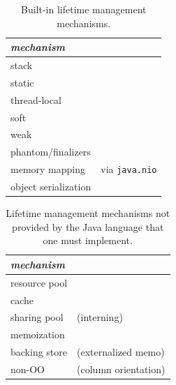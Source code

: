 \begin{table}
\centering
\begin{tabular}{|l|l|} \hline
\em mechanism & \\ \hline \hline
stack & \\ \hline 
static & \\ \hline
thread-local & \\ \hline
soft & \\ \hline
weak & \\ \hline
phantom/finalizers & \\ \hline
memory mapping & via \texttt{java.nio} \\ \hline 
object serialization & \\ \hline
\end{tabular}
\caption{Built-in lifetime management mechanisms.}
\label{tab:builtin-lifetime-management}
\end{table}

\begin{table}
\centering
\begin{tabular}{|l|l|} \hline
\em mechanism & \\ \hline \hline
resource pool & \\ \hline
cache & \\ \hline
sharing pool & (interning)\\ \hline
memoization & \\ \hline
backing store &(externalized memo) \\ \hline
non-OO & (column orientation) \\ \hline 
\end{tabular}
\caption{Lifetime management mechanisms not provided by the Java language that one must implement.}
\label{tab:software-lifetime-management}
\end{table}




